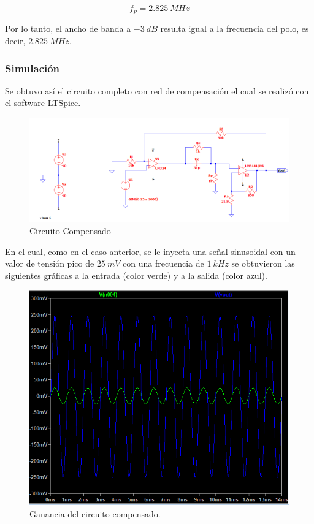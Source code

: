 \begin{equation}
    \boxed{
    f_p = 2.825~MHz
    }
\end{equation}

\hspace{1mm} Por lo tanto, el ancho de banda a \(-3~dB\) resulta igual a la frecuencia del polo, es decir, \(2.825~MHz\).

\subsubsection{Simulación}

\hspace{1mm} Se obtuvo así el circuito completo con red de compensación el cual se realizó con el software LTSpice.

\begin{figure}[H]
    \centering
    \includegraphics[width=0.7\linewidth]{VFA-CFA-Compensado.png}
    \caption{Circuito Compensado}
    \label{fig:enter-label}
\end{figure}

\hspace{1mm} En el cual, como en el caso anterior, se le inyecta una señal sinusoidal con un valor de tensión pico de \(25~mV\) con una frecuencia de \( 1~kHz \) se obtuvieron las siguientes gráficas a la entrada (color verde) y a la salida (color azul).

\begin{figure}[H]
    \centering
    \includegraphics[width=0.7\linewidth]{VFA-CFA-Ganancia-Comp}
    \caption{Ganancia del circuito compensado.}
\end{figure}

